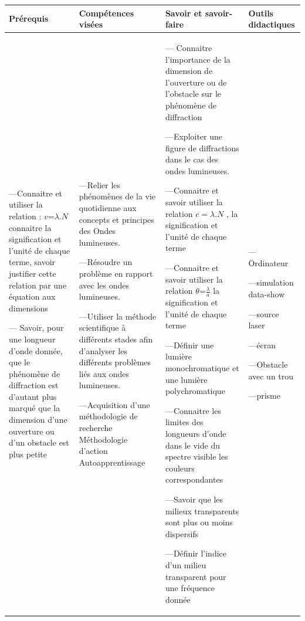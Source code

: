 \documentclass[12pt]{article}
\begin{document}
 \begin{center}
	 \begin{tabular}{|p{}||p{}||p{}||p{}|}
\hline
\textbf{Prérequis} & \textbf{Compétences visées } & \textbf{Savoir et savoir-faire}&\textbf{Outils didactiques }\\
    \hline

---Connaitre et utiliser la relation : $v$=$\lambda.N$ connaitre la signification et l’unité de chaque terme,
savoir justifier cette relation par une équation aux dimensions

--- Savoir, pour une longueur d’onde donnée, que le phénomène de diffraction est d’autant plus
marqué que la dimension d’une ouverture ou d’un obstacle est plus petite




				   &
				 ---Relier les phénomènes de la
vie quotidienne aux concepts
et principes des Ondes lumineuses.

---Résoudre un problème en rapport avec les ondes lumineuses.

---Utiliser la méthode scientifique à différents stades afin d'analyser les différents problèmes liés aux ondes lumineuses.

---Acquisition d'une
méthodologie de recherche
Méthodologie d'action Autoapprentissage

 & 
--- Connaitre l’importance de la dimension de l’ouverture ou de l’obstacle sur le phénomène de diffraction

---Exploiter une figure de diffractions dans le cas des ondes lumineuses.

---Connaitre et savoir utiliser la relation $c = \lambda.N$ , la signification et l’unité de chaque terme

---Connaitre et savoir utiliser la relation $\theta$=$\frac{\lambda}{a}$ la signification et l’unité de chaque terme

---Définir une lumière monochromatique et une lumière polychromatique

---Connaitre les limites des longueurs d’onde dans le vide du spectre visible les couleurs correspondantes

---Savoir que les milieux transparents sont plus ou moins dispersifs

---Définir l’indice d’un milieu transparent pour une fréquence donnée

 & 

---Ordinateur  

---simulation data-show 

---source laser

---écran

---Obstacle avec un trou

---prisme
\\
    \hline
\end{tabular} 
\end{center}
\end{document}
